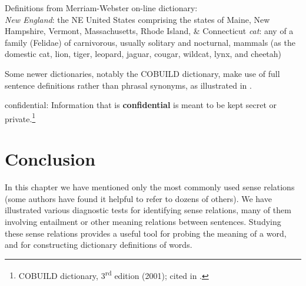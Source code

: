 \ea \label{ex:6.25}
Definitions from Merriam-Webster on-line dictionary:\\
\ea   \textit{New England}: the NE United States comprising the states of Maine, New Hampshire, Vermont, Massachusetts, Rhode Island, \& Connecticut
\ex  \textit{cat}: any of a family (Felidae) of carnivorous, usually solitary and nocturnal, mammals (as the domestic cat, lion, tiger, leopard, jaguar, cougar, wildcat, lynx, and cheetah)
\z \z

Some newer dictionaries, notably the COBUILD dictionary, make use of full sentence definitions rather than phrasal synonyms, as illustrated in .

\ea \label{ex:6.26}
confidential: Information that is \textbf{confidential} is meant to be kept secret or private.\footnote{COBUILD dictionary, 3\textsuperscript{rd} edition (2001); cited in \citet{Rundell2006}.}
\z

\section{Conclusion}\label{sec:6.4}

In this chapter we have mentioned only the most commonly used sense relations (some authors have found it helpful to refer to dozens of others). We have illustrated various diagnostic tests for identifying sense relations, many of them involving entailment or other meaning relations between sentences. Studying these sense relations provides a useful tool for probing the meaning of a word, and for constructing dictionary definitions of words.





